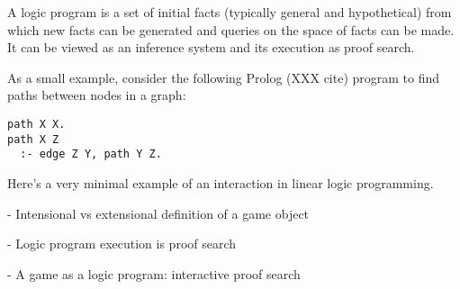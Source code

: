 A logic program is a set of initial facts (typically general and
hypothetical) from which new facts can be generated and queries on the
space of facts can be made. It can be viewed as an inference system and its
execution as proof search.

As a small example, consider the following Prolog (XXX cite) program to
find paths between nodes in a graph:

\begin{verbatim}
path X X.
path X Z
  :- edge Z Y, path Y Z.
\end{verbatim}



Here's a very minimal example of an interaction in linear logic
programming.



- Intensional vs extensional definition of a game object

- Logic program execution is proof search

- A game as a logic program: interactive proof search


